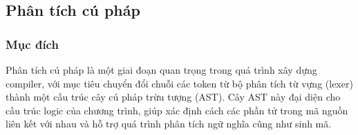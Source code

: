 \subsection{Phân tích cú pháp}
\subsubsection{Mục đích}
Phân tích cú pháp là một giai đoạn quan trọng trong quá trình xây dựng compiler, với mục tiêu chuyển đổi chuỗi các token từ bộ phân tích từ vựng (lexer) thành một cấu trúc cây cú pháp trừu tượng (AST). Cây AST này đại diện cho cấu trúc logic của chương trình, giúp xác định cách các phần tử trong mã nguồn liên kết với nhau và hỗ trợ quá trình phân tích ngữ nghĩa cũng như sinh mã.

\vspace{1cm}
\hspace{-1.5cm}
